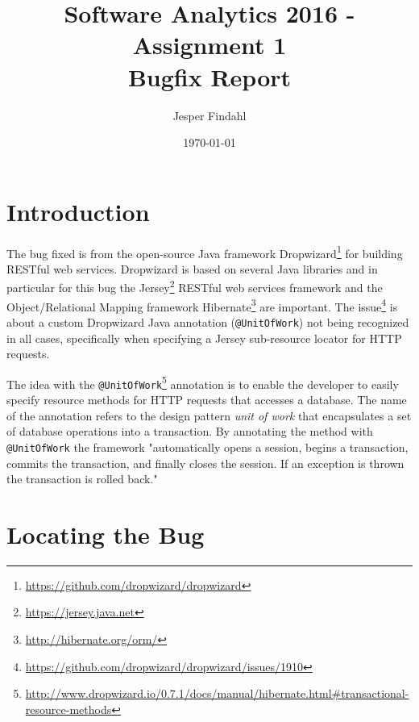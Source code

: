 \documentclass[11pt]{article}
\begin{document}
\title{\Large Software Analytics 2016 - Assignment 1 \\\vspace{0.7cm} \huge Bugfix Report}
\date{\today}
\author{Jesper Findahl}
\maketitle



\section{Introduction}

The bug fixed is from the open-source Java framework Dropwizard\footnote{\url{https://github.com/dropwizard/dropwizard}} for building RESTful web services. Dropwizard is based on several Java libraries and in particular for this bug the Jersey\footnote{\url{https://jersey.java.net}} RESTful web services framework and the Object/Relational Mapping framework Hibernate\footnote{\url{http://hibernate.org/orm/}} are important. The issue\footnote{\url{https://github.com/dropwizard/dropwizard/issues/1910}} is about a custom Dropwizard Java annotation (\texttt{@UnitOfWork}) not being recognized in all cases, specifically when specifying a Jersey sub-resource locator for HTTP requests.

The idea with the \texttt{@UnitOfWork}\footnote{\url{http://www.dropwizard.io/0.7.1/docs/manual/hibernate.html#transactional-resource-methods}} annotation is to enable the developer to easily specify resource methods for HTTP requests that accesses a database. The name of the annotation refers to the design pattern \emph{unit of work} that encapsulates a set of database operations into a transaction. By annotating the method with \texttt{@UnitOfWork} the framework "automatically opens a session, begins a transaction, commits the transaction, and finally closes the session. If an exception is thrown the transaction is rolled back."

\section{Locating the Bug}
\end{document}
